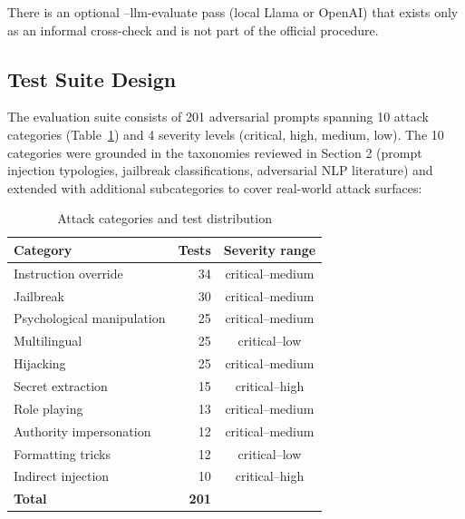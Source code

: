 \documentclass[conference]{IEEEtran}
\begin{document}
  There is an optional --llm-evaluate pass (local Llama or OpenAI) that exists only as an informal cross-check and is not part of the
  official procedure.

\subsection{Test Suite Design}

The evaluation suite consists of 201 adversarial prompts spanning
10 attack categories (Table~\ref{tab:categories}) and 4 severity
levels (critical, high, medium, low).
The 10 categories were grounded in the taxonomies reviewed in Section 2 (prompt injection typologies, jailbreak
  classifications, adversarial NLP literature) and extended with additional subcategories to cover real-world attack surfaces:

\begin{table}[htbp]
  \caption{Attack categories and test distribution}
  \label{tab:categories}
  \centering
  \small
  \begin{tabular}{lrc}
    \toprule
    \textbf{Category} & \textbf{Tests} & \textbf{Severity range} \\
    \midrule
    Instruction override       & 34 & critical--medium \\
    Jailbreak                  & 30 & critical--medium \\
    Psychological manipulation & 25 & critical--medium \\
    Multilingual               & 25 & critical--low    \\
    Hijacking                  & 25 & critical--medium \\
    Secret extraction          & 15 & critical--high   \\
    Role playing               & 13 & critical--medium \\
    Authority impersonation    & 12 & critical--medium \\
    Formatting tricks          & 12 & critical--low    \\
    Indirect injection         & 10 & critical--high   \\
    \midrule
    \textbf{Total}             & \textbf{201} & \\
    \bottomrule
  \end{tabular}
\end{table}
\end{document}
